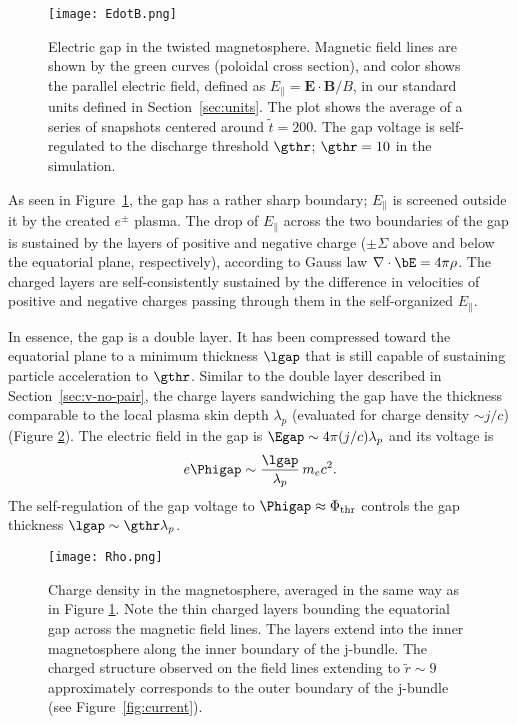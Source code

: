 \begin{figure}[t]
  \centering
  \texttt{[image: EdotB.png]}
  \caption{Electric gap in the twisted magnetosphere. Magnetic field lines
   are shown by the green curves (poloidal cross section), and color shows the
    parallel electric field, defined as $E_\parallel=\mathbf{E}\cdot \mathbf{B}/B$,
    in our standard units defined in Section~\ref{sec:units}.
    The plot shows the average of a series of snapshots centered around
    $\tilde{t} = 200$. The gap voltage is self-regulated to the discharge threshold
    $\gthr$;  $\gthr=10$ in the simulation.}
  \label{fig:EdotB}
\end{figure}

As seen in Figure~\ref{fig:EdotB}, the gap has a rather sharp boundary;
$E_\parallel$ is screened outside it by the created $e^\pm$ plasma.
The drop of $E_\parallel$ across the two boundaries of the gap is sustained by the layers
of positive and negative charge ($\pm\Sigma$ above and below the equatorial plane,
respectively), according to Gauss law $\nabla\cdot\bE=4\pi\rho$.
The charged layers are self-consistently sustained by the difference in velocities of
positive and negative charges passing through them in the self-organized $E_\parallel$.

In essence, the gap is a double layer. It has been compressed toward
the equatorial plane to a minimum thickness $\lgap$ that is still capable of sustaining
particle acceleration to $\gthr$.
Similar to the double layer described in Section~\ref{sec:v-no-pair}, the charge layers sandwiching
the gap have the thickness comparable to the local plasma skin depth $\lambda_p$
(evaluated for charge density $\sim j/c$) (Figure \ref{fig:rho}).
The electric field in the gap is $\Egap\sim 4\pi (j/c)\lambda_p$ and its voltage is
\begin{equation}
  e\Phigap\sim \frac{\lgap}{\lambda_p}\,m_ec^2.
\end{equation}
The self-regulation of the gap voltage to $\Phigap\approx \Phi_{\rm thr}$
controls the gap thickness $\lgap\sim\gthr\lambda_p$.

\begin{figure}[t]
  \centering
  \texttt{[image: Rho.png]}
  \caption{Charge density in the magnetosphere, averaged in the same way as
      in Figure \ref{fig:EdotB}. Note the thin charged
  layers bounding the equatorial gap
  across the magnetic field lines. The layers extend into the inner magnetosphere
  along the inner boundary of the j-bundle. The charged structure observed on the field
  lines extending to $\tilde{r}\sim 9$ approximately corresponds to the outer boundary of
  the j-bundle (see Figure~\ref{fig:current}).}

  \label{fig:rho}
\end{figure}

